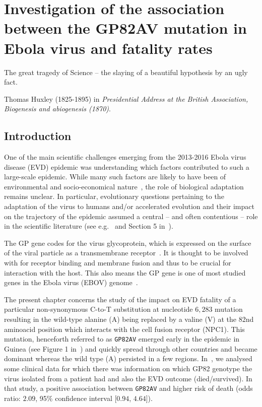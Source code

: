 \chapter{Investigation of the association between the GP82AV mutation in Ebola virus and fatality rates}
\epigraph{The great tragedy of Science -- the slaying of a beautiful hypothesis by an ugly fact.}{Thomas Huxley (1825-1895) in \textit{Presidential Address at the British Association, Biogenesis and abiogenesis (1870)}.}

\section{Introduction}

One of the main scientific challenges emerging from the 2013-2016 Ebola virus disease (EVD) epidemic was understanding which factors contributed to such a large-scale epidemic.
While many such factors are likely to have been of environmental and socio-economical nature~\citep{Dudas2017}, the role of biological adaptation remains unclear.
In particular, evolutionary questions pertaining to the adaptation of the virus to humans and/or accelerated evolution and their impact on the trajectory of the epidemic assumed a central -- and often contentious -- role in the scientific literature (see e.g.~\cite{Holmes2016} and Section 5 in~\cite{Bausch2017}).

The GP gene codes for the virus glycoprotein, which is expressed on the surface of the viral particle as a transmembrane receptor~\citep{Takada1997}.
It is thought to be involved with  for receptor binding and membrane fusion and thus to be crucial for interaction with the host.
This also means the GP gene is one of most studied genes in the Ebola virus (EBOV) genome~\citep{Li2016}.

The present chapter concerns the study of the impact on EVD fatality of a particular non-synonymous C-to-T substitution at nucleotide $6,283$ mutation resulting in the wild-type alanine (A) being replaced by a valine (V) at the 82nd aminoacid position which interacts with the cell fusion receptor (NPC1).
This mutation, henceforth referred to as \verb|GP82AV| emerged early in the epidemic in Guinea (see Figure 1 in~\cite{Diehl2016}) and quickly spread through other countries and became dominant whereas the wild type (A) persisted in a few regions.
In~\cite{Diehl2016}, we analysed some clinical data for which there was information on which GP82 genotype the virus isolated from a patient had and also the EVD outcome (died/survived).
In that study, a positive association between  \verb|GP82AV| and higher risk of death (odds ratio: $2.09$, 95\% confidence interval [$0.94$, $4.64$]).


